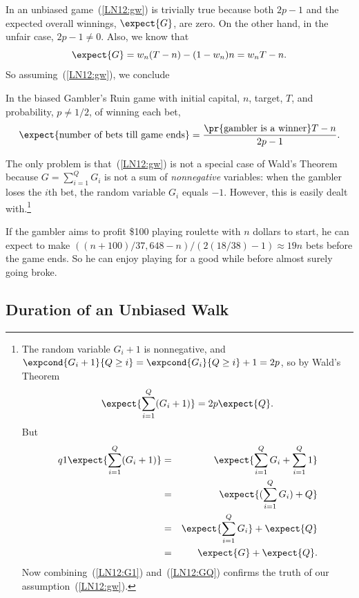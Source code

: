 \begin{staffnotes}
In an unbiased game~(\ref{LN12:gw}) is trivially true because both $2p-1$ and
the expected overall winnings, $\expect{G}$, are zero.  On the other hand,
in the unfair case, $2p-1 \neq 0$.  Also, we know that
\[
\expect{G} = w_n(T-n) - (1-w_n)n = w_nT-n.
\]
So assuming~(\ref{LN12:gw}), we conclude
\begin{theorem}\label{LN12:ExQthm}
In the biased Gambler's Ruin game with initial capital, $n$, target,
$T$, and probability, $p \neq 1/2$, of winning each bet,
\begin{equation}\label{LN12:ExQ}
\expect{\text{number of bets till game ends}} =
\frac{\pr{\text{gambler is a winner}}T-n}{2p-1}.
\end{equation}
\end{theorem}

The only problem is that~(\ref{LN12:gw}) is not a special case of Wald's
Theorem because $G = \sum_{i=1}^Q G_i$ is not a sum of \emph{nonnegative}
variables: when the gambler loses the $i$th bet, the random variable $G_i$
equals $-1$.  However, this is easily dealt with.\footnote{The random variable
$G_i+1$ is nonnegative, and $\expcond{G_i+1}{Q \geq i} =
\expcond{G_i}{Q\geq i}+1 = 2p$, so by Wald's Theorem
\begin{equation}\label{LN12:G1}
\expect{\sum_{i=1}^Q (G_i+1)}  = 2p\expect{Q}.
\end{equation}
But
\begin{eqnarray}q1
\expect{\sum_{i=1}^Q (G_i+1)} & = & \expect{\sum_{i=1}^Q G_i + \sum_{i=1}^Q 1}\notag\\
   & = & \expect{(\sum_{i=1}^Q G_i) + Q}\notag\\
   & = & \expect{\sum_{i=1}^Q G_i} + \expect{Q}\notag\\
   & = & \expect{G} + \expect{Q}\label{LN12:GQ}.
\end{eqnarray}
Now combining~(\ref{LN12:G1}) and~(\ref{LN12:GQ}) confirms the truth of our
assumption~(\ref{LN12:gw}).}

\begin{example}
If the gambler aims to profit \$100 playing roulette with $n$ dollars to
start, he can expect to make $((n+100)/37,648 - n)/(2(18/38) - 1) \approx
19n$ bets before the game ends.  So he can enjoy playing for a good while
before almost surely going broke.
\end{example}


\subsection{Duration of an Unbiased Walk}


\end{staffnotes}
